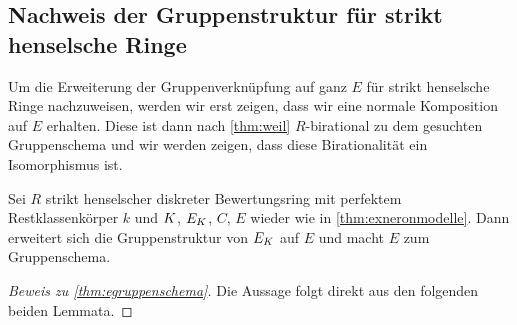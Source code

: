 \subsection{Nachweis der Gruppenstruktur für strikt henselsche Ringe}
Um die Erweiterung der Gruppenverknüpfung auf ganz $E$ für strikt
henselsche Ringe nachzuweisen, werden wir erst zeigen, dass wir eine
normale Komposition auf $E$ erhalten.
Diese ist dann nach \ref{thm:weil} $R$-birational zu dem gesuchten
Gruppenschema und wir werden zeigen, dass diese Birationalität ein
Isomorphismus ist.
\begin{Satz}\label{thm:egruppenschema}
  Sei $R$ strikt henselscher diskreter Bewertungsring mit perfektem
  Restklassenkörper $k$ und $K$, $E_{K}$, $C$, $E$ wieder wie in
  \ref{thm:exneronmodelle}.
  Dann erweitert sich die Gruppenstruktur von $E_{K}$ auf $E$ und macht
  $E$ zum Gruppenschema.
  \begin{proof}[Beweis zu \ref{thm:egruppenschema}]
    Die Aussage folgt direkt aus den folgenden beiden Lemmata.
  \end{proof}
\end{Satz}
